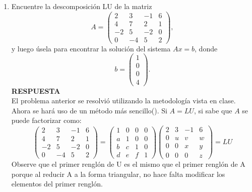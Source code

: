 \documentclass[11pt,letterpaper]{article}
\newcommand{\res}{\textbf{RESPUESTA}\\}
\begin{document}
\begin{enumerate}
\item Encuentre la descomposición LU de la matriz
\begin{equation*}
A=\left(\begin{array}{rrrr}
 2 &  3 & -1 & 6\\
 4 &  7 &  2 & 1\\
-2 &  5 & -2 & 0\\
 0 & -4 &  5 & 2
\end{array} \right),
\end{equation*}
y luego úsela para encontrar la solución del sistema $Ax=b$, donde 
\begin{equation*}
b=\left(\begin{array}{c}
1\\
0\\
0\\
4
\end{array} \right).
\end{equation*}
\res 
El problema anterior se resolvió utilizando la metodología vista en clase. Ahora se hará uso de
un método más sencillo(). Si $A =LU$, si sabe que $A$ se puede factorizar como:
\begin{equation*}
\left(\begin{array}{rrrr}
 2 &  3 & -1 & 6\\
 4 &  7 &  2 & 1\\
-2 &  5 & -2 & 0\\
 0 & -4 &  5 & 2
\end{array} \right) =
\left(\begin{array}{rrrr}
 1 &  0 &  0 & 0\\
 a &  1 &  0 & 0\\
 b &  c &  1 & 0\\
 d &  e &  f & 1
\end{array} \right) \left(\begin{array}{rrrr}
 2 &  3 & -1 & 6\\
 0 &  u &  v & w\\
 0 &  0 &  x & y\\
 0 &  0 &  0 & z
\end{array} \right)=LU
\end{equation*}
Observe que el primer renglón de U es el mismo que el primer renglón de A porque al reducir A a la forma triangular, no hace falta modificar los elementos del primer renglón.\\

\end{enumerate}
\end{document}
